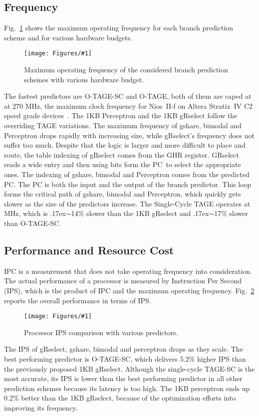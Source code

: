 \documentclass[conference]{IEEEtran}
\newcommand{\mytilde}{{\raise.17ex\hbox{$\scriptstyle\sim$}}}
\newcommand{\kfig}[4]{ %
        \begin{figure}[!t]
        \centering
        \texttt{[image: Figures/\#1]}
        \vspace{-1mm}
        \caption{#3}
        \label{#2}
        \end{figure}
}
\begin{document}
\subsection{Frequency}
\label{sec:eval:fmax}
Fig.~\ref{fig:adfmax} shows the maximum operating frequency for each branch prediction scheme and for various hardware budgets.
\kfig{adfmax.pdf}{fig:adfmax}{Maximum operating frequency of the considered branch prediction schemes with various hardware budget.}{angle = 0, trim = 0.8in 4.6in 0.7in 5.2in, clip, width=0.5\textwidth}

The fastest predictors are \mbox{O-TAGE-SC} and \mbox{O-TAGE}, both of them are caped at at 270 MHz, the maximum clock frequency for Nios~II-f on Altera Stratix~IV C2 speed grade devices~\cite{niosfmax}. The 1KB Perceptron and the 1KB gRselect follow the overriding TAGE variations. The maximum frequency of gshare, bimodal and Perceptron drops rapidly with increasing size, while gRselect's frequency does not suffer too much. Despite that the logic is larger and more difficult to place and route,  the table indexing of gRselect comes from the GHR register. GRselect reads a wide entry and then using bits form the PC\ to select the appropriate ones. The indexing of gshare, bimodal and Perceptron comes from the predicted PC. The PC is both the input and the output of the branch predictor. This loop forms the critical path of gshare, bimodal and Perceptron, which quickly gets slower as the size of the predictors increase. The Single-Cycle TAGE operates at MHz, which is \mytilde14\% slower than the 1KB gRselect and \mytilde 17\% slower than \mbox{O-TAGE-SC}.

\subsection{Performance and Resource Cost}
\label{sec:eval:perf}
IPC is a measurement that does not take operating frequency into consideration. The actual performance of a processor is measured by Instruction Per Second (IPS), which is the product of IPC and the maximum operating frequency. Fig.~\ref{fig:adips} reports the overall performance in terms of IPS.
\kfig{adips.pdf}{fig:adips}{Processor IPS comparison with various predictors.}{angle = 0, trim = 0.9in 2.7in 0.7in 2.6in, clip, width=0.5\textwidth}

The IPS of gRselect, gshare, bimodal and perceptron drops as they scale. The best performing predictor is \mbox{O-TAGE-SC}, which delivers 5.2\% higher IPS than the previously proposed 1KB gRselect. Although the single-cycle \mbox{TAGE-SC} is the most accurate, its IPS is lower than the best performing predictor in all other prediction schemes  because its latency is too high. The 1KB perceptron ends up 0.2\% better than the 1KB gRselect, because of the optimization efforts into improving its frequency. 
\end{document}
